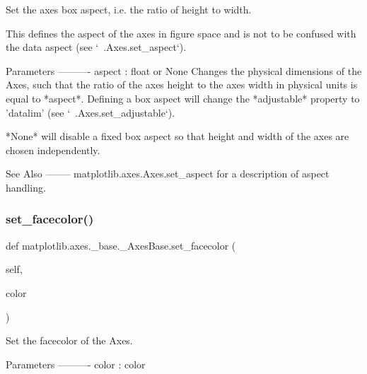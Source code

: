 \begin{DoxyVerb}Set the axes box aspect, i.e. the ratio of height to width.

This defines the aspect of the axes in figure space and is not to be
confused with the data aspect (see `~.Axes.set_aspect`).

Parameters
----------
aspect : float or None
    Changes the physical dimensions of the Axes, such that the ratio
    of the axes height to the axes width in physical units is equal to
    *aspect*. Defining a box aspect will change the *adjustable*
    property to 'datalim' (see `~.Axes.set_adjustable`).

    *None* will disable a fixed box aspect so that height and width
    of the axes are chosen independently.

See Also
--------
matplotlib.axes.Axes.set_aspect
    for a description of aspect handling.
\end{DoxyVerb}
 \mbox{\label{classmatplotlib_1_1axes_1_1__base_1_1__AxesBase_a1a87d87214f7cddc8ad8939687335a36}} 
\subsubsection{\texorpdfstring{set\+\_\+facecolor()}{set\_facecolor()}}
{\footnotesize\ttfamily def matplotlib.\+axes.\+\_\+base.\+\_\+\+Axes\+Base.\+set\+\_\+facecolor (\begin{DoxyParamCaption}\item[{}]{self,  }\item[{}]{color }\end{DoxyParamCaption})}

\begin{DoxyVerb}Set the facecolor of the Axes.

Parameters
----------
color : color
\end{DoxyVerb}
 \mbox{\label{classmatplotlib_1_1axes_1_1__base_1_1__AxesBase_aa8e39d032ac51f668362d7574cdc7f68}} 
